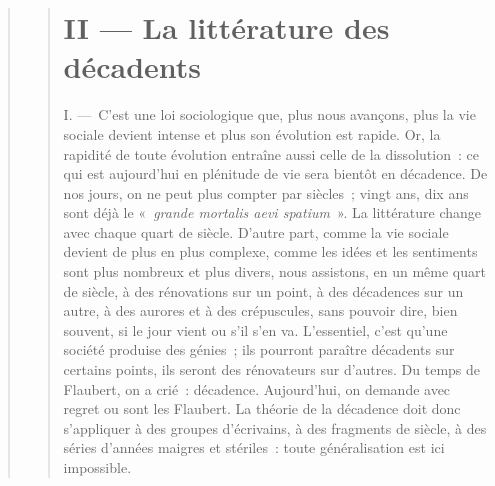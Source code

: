 \documentclass[french,twoside]{book} %
\begin{document}
\begin{verse}
\begin{verse}
\section[{II — La littérature des décadents}]{II — La littérature des décadents}
\noindent I. — C’est une loi sociologique que, plus nous avançons, plus la vie sociale devient intense et plus son évolution est rapide. Or, la rapidité de toute évolution entraîne aussi celle de la dissolution : ce qui est aujourd’hui en plénitude de vie sera bientôt en décadence. De nos jours, on ne peut plus compter par siècles ; vingt ans, dix ans sont déjà le « \emph{grande mortalis aevi spatium} ». La littérature change avec chaque quart de siècle. D’autre part, comme la vie sociale devient de plus en plus complexe, comme les idées et les sentiments sont plus nombreux et plus divers, nous assistons, en un même quart de siècle, à des rénovations sur un point, à des décadences sur un autre, à des aurores et à des crépuscules, sans pouvoir dire, bien souvent, si le jour vient ou s’il s’en va. L’essentiel, c’est qu’une société produise des génies ; ils pourront paraître décadents sur certains points, ils seront des rénovateurs sur d’autres. Du temps de Flaubert, on a crié : décadence. Aujourd’hui, on demande avec regret ou sont les Flaubert. La théorie de la décadence doit donc s’appliquer à des groupes d’écrivains, à des fragments de siècle, à des séries d’années maigres et stériles : toute généralisation est ici impossible.\par

\end{verse}
\end{verse}
\end{document}
